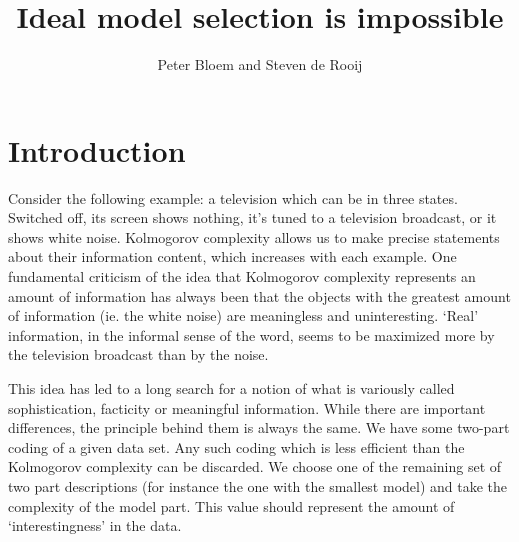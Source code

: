 \documentclass{style/llncs}
\title{Ideal model selection is impossible}
\author{Peter Bloem and Steven de Rooij}
\begin{document}
\maketitle


\section{Introduction}

Consider the following example: a television which can be in three states. Switched off, its screen shows nothing, it's tuned to a television broadcast, or it shows white noise. Kolmogorov complexity allows us to make precise statements about their information content, which increases with each example. One fundamental criticism of the idea that Kolmogorov complexity represents an amount of information has always been that the objects with the greatest amount of information (ie. the white noise) are meaningless and uninteresting. `Real' information, in the informal sense of the word, seems to be maximized more by the television broadcast than by the noise.

This idea has led to a long search for a notion of what is variously called sophistication\cite{koppelSoph1988}, facticity\cite{adriaans2012facticity} or meaningful information. \footnotemark While there are important differences, the principle behind them is always the same. We have some two-part coding of a given data set. Any such coding which is less efficient than the Kolmogorov complexity can be discarded. We choose one of the remaining set of two part descriptions (for instance the one with the smallest model) and take the complexity of the model part. This value should represent the amount of `interestingness' in the data. 
\end{document}
